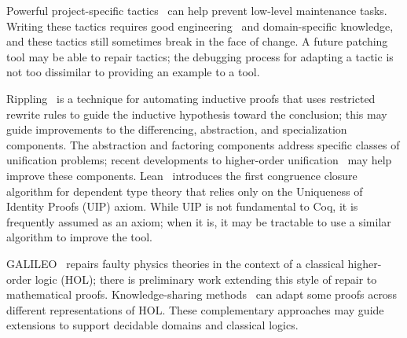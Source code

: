 Powerful project-specific tactics~\cite{chlipala:cpdt, Chlipala2013} can help prevent low-level maintenance tasks.
Writing these tactics requires good engineering~\cite{Gonthier2011} and domain-specific knowledge,
and these tactics still sometimes break in the face of change.
A future patching tool may be able to repair tactics; the debugging process
for adapting a tactic is not too dissimilar to providing an example to a tool.

Rippling~\cite{rippling} is a technique for automating inductive proofs that uses restricted rewrite rules to
guide the inductive hypothesis toward the conclusion; this may guide improvements to the
differencing, abstraction, and specialization components.
The abstraction and factoring components address specific classes of unification problems;
recent developments to higher-order unification~\cite{Miller:2012:PHL:2331097} may help
improve these components.
Lean~\cite{selsam:lean} introduces the first congruence closure algorithm for dependent type theory that
relies only on the Uniqueness of Identity Proofs (UIP) axiom. While UIP is not fundamental to Coq,
it is frequently assumed as an axiom; when it is, it may be tractable to use a similar algorithm to improve the tool.

GALILEO~\cite{bundyreasoning} repairs faulty physics theories
in the context of a classical higher-order logic (HOL); there is preliminary work extending this
style of repair to mathematical proofs. 
Knowledge-sharing methods~\cite{tgck-cicm14} can adapt some proofs across different representations of HOL.
These complementary approaches may guide extensions to support decidable domains and classical logics.


